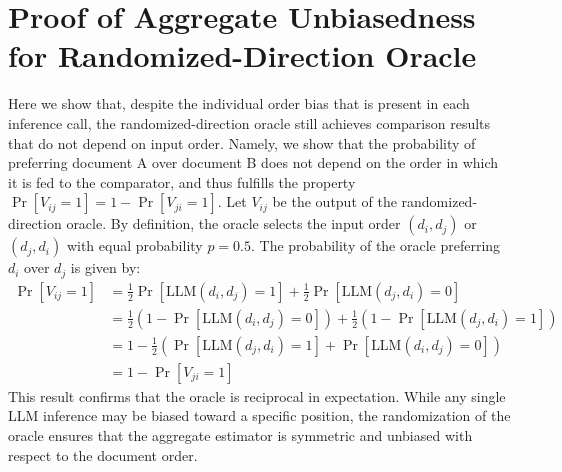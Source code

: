 \documentclass[11pt]{article}
\begin{document}
\section{Proof of Aggregate Unbiasedness for Randomized-Direction Oracle}
\label{sec:unbiased-proof}
Here we show that, despite the individual order bias that is present in each inference call, the randomized-direction oracle still achieves comparison results that do not depend on input order. Namely, we show that the probability of preferring document A over document B does not depend on the order in which it is fed to the comparator, and thus fulfills the property $\Pr[V_{ij}=1] = 1 - \Pr[V_{ji}=1]$. Let $V_{ij}$ be the output of the randomized-direction oracle. By definition, the oracle selects the input order $(d_i, d_j)$ or $(d_j, d_i)$ with equal probability $p=0.5$. The probability of the oracle preferring $d_i$ over $d_j$ is given by:
\begin{align*}
    \Pr[V_{ij}=1] &= \frac{1}{2} \Pr[\text{LLM}(d_i, d_j) = 1] + \frac{1}{2} \Pr[\text{LLM}(d_j, d_i) = 0] \\
    &= \frac{1}{2} \left( 1 - \Pr[\text{LLM}(d_i, d_j) = 0] \right) + \frac{1}{2} \left( 1 - \Pr[\text{LLM}(d_j, d_i) = 1] \right) \\
    &= 1 - \frac{1}{2} \left( \Pr[\text{LLM}(d_j, d_i) = 1] + \Pr[\text{LLM}(d_i, d_j) = 0] \right) \\
    &= 1 - \Pr[V_{ji}=1]
\end{align*}
This result confirms that the oracle is reciprocal in expectation. While any single LLM inference may be biased toward a specific position, the randomization of the oracle ensures that the aggregate estimator is symmetric and unbiased with respect to the document order.

\FloatBarrier
\end{document}
